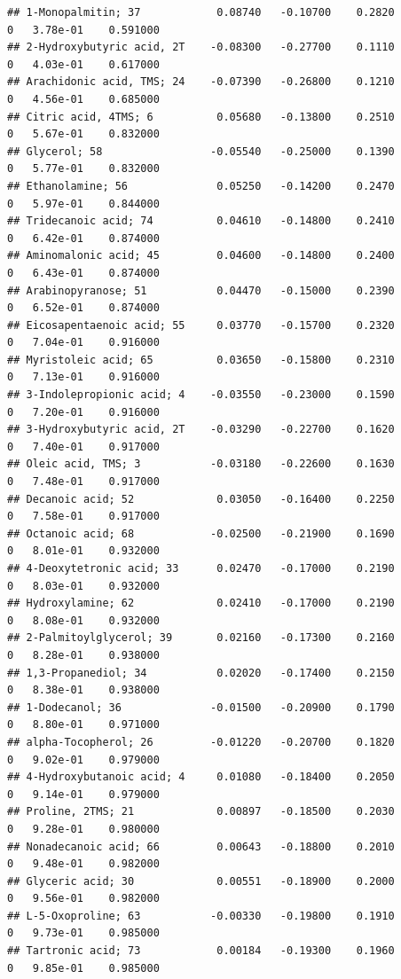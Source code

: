 \documentclass[]{article}
\begin{document}
\begin{verbatim}
## 1-Monopalmitin; 37            0.08740   -0.10700    0.2820         0   3.78e-01    0.591000
## 2-Hydroxybutyric acid, 2T    -0.08300   -0.27700    0.1110         0   4.03e-01    0.617000
## Arachidonic acid, TMS; 24    -0.07390   -0.26800    0.1210         0   4.56e-01    0.685000
## Citric acid, 4TMS; 6          0.05680   -0.13800    0.2510         0   5.67e-01    0.832000
## Glycerol; 58                 -0.05540   -0.25000    0.1390         0   5.77e-01    0.832000
## Ethanolamine; 56              0.05250   -0.14200    0.2470         0   5.97e-01    0.844000
## Tridecanoic acid; 74          0.04610   -0.14800    0.2410         0   6.42e-01    0.874000
## Aminomalonic acid; 45         0.04600   -0.14800    0.2400         0   6.43e-01    0.874000
## Arabinopyranose; 51           0.04470   -0.15000    0.2390         0   6.52e-01    0.874000
## Eicosapentaenoic acid; 55     0.03770   -0.15700    0.2320         0   7.04e-01    0.916000
## Myristoleic acid; 65          0.03650   -0.15800    0.2310         0   7.13e-01    0.916000
## 3-Indolepropionic acid; 4    -0.03550   -0.23000    0.1590         0   7.20e-01    0.916000
## 3-Hydroxybutyric acid, 2T    -0.03290   -0.22700    0.1620         0   7.40e-01    0.917000
## Oleic acid, TMS; 3           -0.03180   -0.22600    0.1630         0   7.48e-01    0.917000
## Decanoic acid; 52             0.03050   -0.16400    0.2250         0   7.58e-01    0.917000
## Octanoic acid; 68            -0.02500   -0.21900    0.1690         0   8.01e-01    0.932000
## 4-Deoxytetronic acid; 33      0.02470   -0.17000    0.2190         0   8.03e-01    0.932000
## Hydroxylamine; 62             0.02410   -0.17000    0.2190         0   8.08e-01    0.932000
## 2-Palmitoylglycerol; 39       0.02160   -0.17300    0.2160         0   8.28e-01    0.938000
## 1,3-Propanediol; 34           0.02020   -0.17400    0.2150         0   8.38e-01    0.938000
## 1-Dodecanol; 36              -0.01500   -0.20900    0.1790         0   8.80e-01    0.971000
## alpha-Tocopherol; 26         -0.01220   -0.20700    0.1820         0   9.02e-01    0.979000
## 4-Hydroxybutanoic acid; 4     0.01080   -0.18400    0.2050         0   9.14e-01    0.979000
## Proline, 2TMS; 21             0.00897   -0.18500    0.2030         0   9.28e-01    0.980000
## Nonadecanoic acid; 66         0.00643   -0.18800    0.2010         0   9.48e-01    0.982000
## Glyceric acid; 30             0.00551   -0.18900    0.2000         0   9.56e-01    0.982000
## L-5-Oxoproline; 63           -0.00330   -0.19800    0.1910         0   9.73e-01    0.985000
## Tartronic acid; 73            0.00184   -0.19300    0.1960         0   9.85e-01    0.985000

\end{verbatim}
\end{document}
